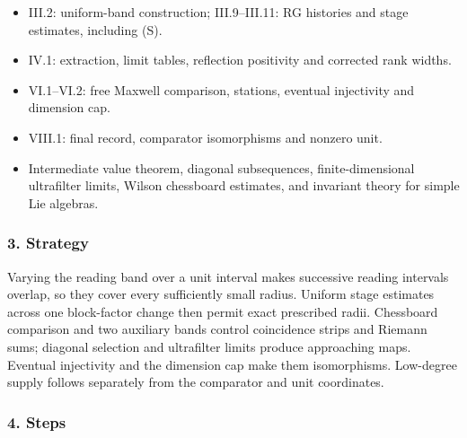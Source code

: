 \documentclass[
  letterpaper,
  11pt]{article}
\providecommand{\tightlist}{%
  \setlength{\itemsep}{0pt}\setlength{\parskip}{0pt}}
\begin{document}
\begin{itemize}
\tightlist
\item
  III.2: uniform-band construction; III.9--III.11: RG histories and
  stage estimates, including (S).
\item
  IV.1: extraction, limit tables, reflection positivity and corrected
  rank widths.
\item
  VI.1--VI.2: free Maxwell comparison, stations, eventual injectivity
  and dimension cap.
\item
  VIII.1: final record, comparator isomorphisms and nonzero unit.
\item
  Intermediate value theorem, diagonal subsequences, finite-dimensional
  ultrafilter limits, Wilson chessboard estimates, and invariant theory
  for simple Lie algebras.
\end{itemize}

\subsubsection{3. Strategy}\label{strategy-30}

Varying the reading band over a unit interval makes successive reading
intervals overlap, so they cover every sufficiently small radius.
Uniform stage estimates across one block-factor change then permit exact
prescribed radii. Chessboard comparison and two auxiliary bands control
coincidence strips and Riemann sums; diagonal selection and ultrafilter
limits produce approaching maps. Eventual injectivity and the dimension
cap make them isomorphisms. Low-degree supply follows separately from
the comparator and unit coordinates.

\subsubsection{4. Steps}\label{steps-30}
\end{document}
